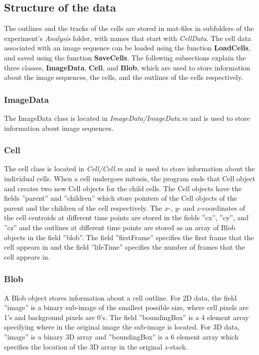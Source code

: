 \documentclass[a4paper, oneside, onecolumn, 11pt]{article}
\newcommand{\file}[1]{\emph{#1}}
\newcommand{\setting}[1]{''#1''}
\newcommand{\command}[1]{\textbf{#1}}
\begin{document}
\subsection{Structure of the data}
The outlines and the tracks of the cells are stored in mat-files in subfolders of the experiment's \file{Analysis} folder, with names that start with \file{CellData}. The cell data associated with an image sequence can be loaded using the function \command{LoadCells}, and saved using the function \command{SaveCells}. The following subsections explain the three classes, \command{ImageData}, \command{Cell}, and \command{Blob}, which are used to store information about the image sequences, the cells, and the outlines of the cells respectively.

\subsubsection{ImageData}
\label{sec:imagedata}
The ImageData class is located in \file{ImageData/\allowbreak ImageData.m} and is used to store information about image sequences.

\subsubsection{Cell}
\label{sec:cell}
The cell class is located in \file{Cell/\allowbreak Cell.m} and is used to store information about the individual cells. When a cell undergoes mitosis, the program ends that Cell object and creates two new Cell objects for the child cells. The Cell objects have the fields \setting{parent} and \setting{children} which store pointers of the Cell objects of the parent and the children of the cell respectively. The $x$-, $y$- and $z$-coordinates  of the cell centroids at different time points are stored in the fields \setting{cx}, \setting{cy}, and \setting{cz} and the outlines at different time points are stored as an array of Blob objects in the field \setting{blob}. The field \setting{firstFrame} specifies the first frame that the cell appears in and the field \setting{lifeTime} specifies the number of frames that the cell appears in.

\subsubsection{Blob}
\label{sec:blob}
A Blob object stores information about a cell outline. For 2D data, the field \setting{image} is a binary sub-image of the smallest possible size, where cell pixels are 1's and background pixels are 0's. The field \setting{boundingBox} is a 4 element array specifying where in the original image the sub-image is located. For 3D data, \setting{image} is a binary 3D array and \setting{boundingBox} is a 6 element array which specifies the location of the 3D array in the original $z$-stack.
\end{document}
